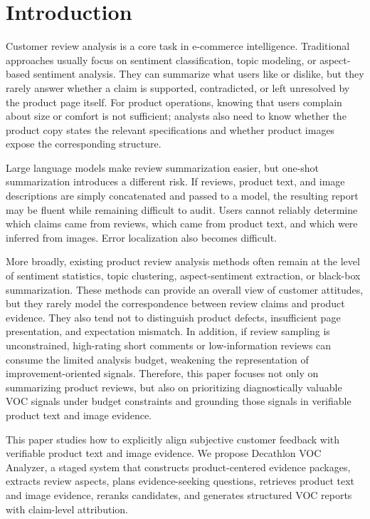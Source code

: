 \documentclass[11pt]{article}
\begin{document}
\section{Introduction}
Customer review analysis is a core task in e-commerce intelligence. Traditional approaches usually focus on sentiment classification, topic modeling, or aspect-based sentiment analysis. They can summarize what users like or dislike, but they rarely answer whether a claim is supported, contradicted, or left unresolved by the product page itself. For product operations, knowing that users complain about size or comfort is not sufficient; analysts also need to know whether the product copy states the relevant specifications and whether product images expose the corresponding structure.

Large language models make review summarization easier, but one-shot summarization introduces a different risk. If reviews, product text, and image descriptions are simply concatenated and passed to a model, the resulting report may be fluent while remaining difficult to audit. Users cannot reliably determine which claims came from reviews, which came from product text, and which were inferred from images. Error localization also becomes difficult.

More broadly, existing product review analysis methods often remain at the level of sentiment statistics, topic clustering, aspect-sentiment extraction, or black-box summarization. These methods can provide an overall view of customer attitudes, but they rarely model the correspondence between review claims and product evidence. They also tend not to distinguish product defects, insufficient page presentation, and expectation mismatch. In addition, if review sampling is unconstrained, high-rating short comments or low-information reviews can consume the limited analysis budget, weakening the representation of improvement-oriented signals. Therefore, this paper focuses not only on summarizing product reviews, but also on prioritizing diagnostically valuable VOC signals under budget constraints and grounding those signals in verifiable product text and image evidence.

This paper studies how to explicitly align subjective customer feedback with verifiable product text and image evidence. We propose Decathlon VOC Analyzer, a staged system that constructs product-centered evidence packages, extracts review aspects, plans evidence-seeking questions, retrieves product text and image evidence, reranks candidates, and generates structured VOC reports with claim-level attribution.
\end{document}
